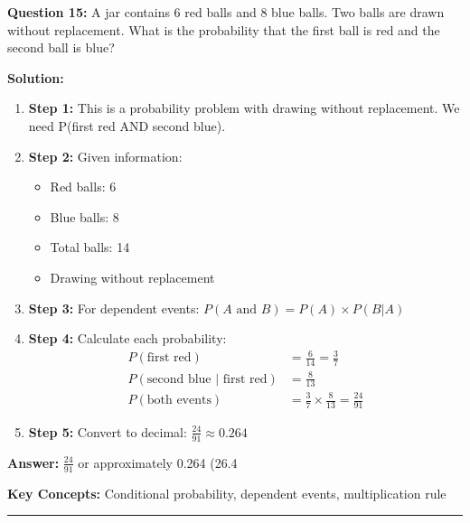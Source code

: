 \textbf{Question 15:} A jar contains 6 red balls and 8 blue balls. Two balls are drawn without replacement. What is the probability that the first ball is red and the second ball is blue?

\textbf{Solution:}
\begin{enumerate}
\item \textbf{Step 1:} This is a probability problem with drawing without replacement. We need P(first red AND second blue).

\item \textbf{Step 2:} Given information:
\begin{itemize}
\item Red balls: 6
\item Blue balls: 8
\item Total balls: 14
\item Drawing without replacement
\end{itemize}

\item \textbf{Step 3:} For dependent events: $P(A \text{ and } B) = P(A) \times P(B|A)$

\item \textbf{Step 4:} Calculate each probability:
\begin{align}
P(\text{first red}) &= \frac{6}{14} = \frac{3}{7} \\
P(\text{second blue | first red}) &= \frac{8}{13} \\
P(\text{both events}) &= \frac{3}{7} \times \frac{8}{13} = \frac{24}{91}
\end{align}

\item \textbf{Step 5:} Convert to decimal: $\frac{24}{91} \approx 0.264$
\end{enumerate}

\textbf{Answer:} $\frac{24}{91}$ or approximately 0.264 (26.4%

\textbf{Key Concepts:} Conditional probability, dependent events, multiplication rule

\hrule
\vspace{1em}
